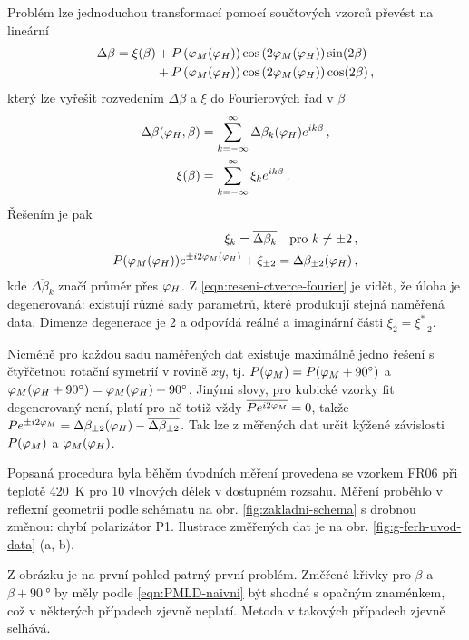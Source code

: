 Problém lze jednoduchou transformací pomocí součtových vzorců převést na lineární
\begin{align}
\label{eqn:PMLD-linearizovane}
\Delta\beta =\xi(\beta) &+ P\left(\varphi_M(\varphi_H)\right)\cos\left(2\varphi_M(\varphi_H)\right)\sin(2\beta) 
           \\&+P\left(\varphi_M(\varphi_H)\right)\cos\left(2\varphi_M(\varphi_H)\right)\cos(2\beta) \,,
\end{align}
který lze vyřešit rozvedením $\Delta\beta$ a $\xi$ do Fourierových řad v $\beta$
\begin{align}
    \Delta\beta(\varphi_H, \beta) &= \sum_{k=-\infty}^\infty \Delta\beta_k(\varphi_H) e^{ik\beta} \,,\\
    \xi(\beta) &= \sum_{k=-\infty}^\infty \xi_k e^{ik\beta}  \,.
\end{align}
Řešením je pak
\begin{align}
    \xi_k = \overline{\Delta\beta_{k}} \quad \textrm{pro} \,\, k\neq\pm2 \,,\\
    P(\varphi_M(\varphi_H)) e^{\pm i2\varphi_M(\varphi_H)} + \xi_{\pm2} = \Delta\beta_{\pm2}(\varphi_H) \,,\label{eqn:reseni-ctverce-fourier}
\end{align}
kde $\overline{\Delta\beta_k}$ značí průměr přes $\varphi_H$.
Z \eqref{eqn:reseni-ctverce-fourier} je vidět, že úloha je degenerovaná: existují různé sady parametrů, které produkují stejná naměřená data.
Dimenze degenerace je 2 a odpovídá reálné a imaginární části $\xi_2=\xi_{-2}^*$.

Nicméně pro každou sadu naměřených dat existuje maximálně jedno řešení s čtyřčetnou rotační symetrií v rovině $xy$, tj. $P(\varphi_M)=P(\varphi_M+\SI{90}{\degree})$ a $\varphi_M(\varphi_H+\SI{90}{\degree})=\varphi_M(\varphi_H)+\SI{90}{\degree}$.
Jinými slovy, pro kubické vzorky fit degenerovaný není, platí pro ně totiž vždy $\overline{Pe^{i2\varphi_M}}=0$, takže $Pe^{\pm i2\varphi_M}=\Delta\beta_{\pm2}(\varphi_H)-\overline{\Delta\beta_{\pm2}}$.
Tak lze z měřených dat určit kýžené závislosti $P(\varphi_M)$ a $\varphi_M(\varphi_H)$.

Popsaná procedura byla běhěm úvodních měření provedena se vzorkem FR06 při teplotě \SI{420}{\kelvin} pro 10 vlnových délek v dostupném rozsahu.
Měření proběhlo v reflexní geometrii podle schématu na obr. \ref{fig:zakladni-schema} s drobnou změnou: chybí polarizátor P1.
Ilustrace změřených dat je na obr. \ref{fig:g-ferh-uvod-data} (a, b).

Z obrázku je na první pohled patrný první problém.
Změřené křivky pro $\beta$ a $\beta+\SI{90}{\degree}$ by měly podle \eqref{eqn:PMLD-naivni} být shodné s opačným znaménkem, což v některých případech zjevně neplatí.
Metoda v takových případech zjevně selhává.

